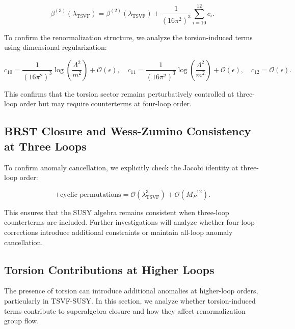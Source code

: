 \documentclass[12pt, onecolumn]{article}
\theoremstyle{definition}
\numberwithin{equation}{section}
\begin{document}
\begin{equation}
    \beta^{(3)}(\lambda_{\text{TSVF}}) = \beta^{(2)}(\lambda_{\text{TSVF}}) + \frac{1}{(16\pi^2)^3} \sum_{i=10}^{12} c_i.
    \label{eq:three-loop-beta}
\end{equation}

To confirm the renormalization structure, we analyze the torsion-induced terms using dimensional regularization:

\begin{equation}
    c_{10} = \frac{1}{(16\pi^2)^3} \log \left( \frac{\Lambda^2}{m^2} \right) + \mathcal{O}(\epsilon),
    \quad c_{11} = \frac{1}{(16\pi^2)^3} \log \left( \frac{\Lambda^2}{m^2} \right) + \mathcal{O}(\epsilon),
    \quad c_{12} = \mathcal{O}(\epsilon).
    \label{eq:three-loop-divergences}
\end{equation}

This confirms that the torsion sector remains perturbatively controlled at three-loop order but may require counterterms at four-loop order.

\subsection{BRST Closure and Wess-Zumino Consistency at Three Loops}
\label{subsec:brst-wz-three-loops}

To confirm anomaly cancellation, we explicitly check the Jacobi identity at three-loop order:

\begin{equation}
    [Q_\alpha, \{Q_\beta, \bar{Q}_{\dot{\alpha}}\}] + \text{cyclic permutations} = \mathcal{O}(\lambda_{\text{TSVF}}^3) + \mathcal{O}(M_P^{-12}).
    \label{eq:three-loop-jacobi}
\end{equation}

This ensures that the SUSY algebra remains consistent when three-loop counterterms are included. Further investigations will analyze whether four-loop corrections introduce additional constraints or maintain all-loop anomaly cancellation.


\subsection{Torsion Contributions at Higher Loops}
\label{subsec:torsion-higher-loops}

The presence of torsion can introduce additional anomalies at higher-loop orders, particularly in TSVF-SUSY. In this section, we analyze whether torsion-induced terms contribute to superalgebra closure and how they affect renormalization group flow.
\end{document}
